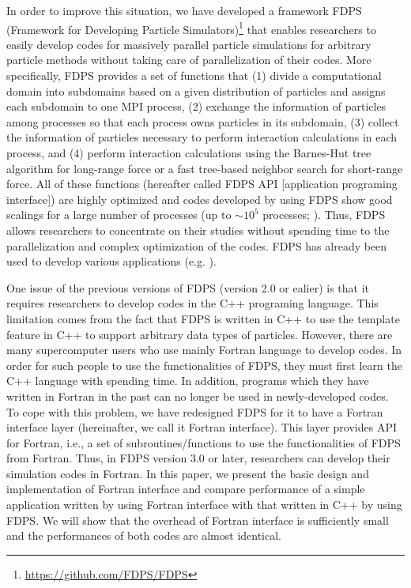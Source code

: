 \documentclass[twocolumn,useamsfonts]{pasj01}
\begin{document}
In order to improve this situation, we have developed a framework FDPS (Framework for Developing Particle Simulators)\footnote{\url{https://github.com/FDPS/FDPS}} \citep{2015FDPS,iwasawa16:_implem_fdps} that enables researchers to easily develop codes for massively parallel particle simulations for arbitrary particle methods without taking care of parallelization of their codes. More specifically, FDPS provides a set of functions that (1) divide a computational domain into subdomains based on a given distribution of particles and assigns each subdomain to one MPI process, (2) exchange the information of particles among processes so that each process owns particles in its subdomain, (3) collect the information of particles necessary to perform interaction calculations in each process, and (4) perform interaction calculations using the Barnes-Hut tree algorithm for long-range force or a fast tree-based neighbor search for short-range force. All of these functions (hereafter called FDPS API [application programing interface]) are highly optimized and codes developed by using FDPS show good scalings for a large number of processes (up to $\sim 10^{5}$ processes; \citet{iwasawa16:_implem_fdps}). Thus, FDPS allows researchers to concentrate on their studies without spending time to the parallelization and complex optimization of the codes. FDPS has already been used to develop various applications (e.g. \cite{hosono16:_a_comparison_of_sph,hosono16:_the_giant_impact,hosono17:_unconv_of_very_large,michikoshi17a:_simulat_smallest,tanikawa17:_does_explo_nucl,iwasawa17:_pentacle_parallelized,tanikawa18:_tidal_double_detona,tanikawa18:_high_resolution_hydro}).

One issue of the previous versions of FDPS (version 2.0 or ealier) is that it requires researchers to develop codes in the C++ programing language. This limitation comes from the fact that FDPS is written in C++ to use the template feature in C++ to support arbitrary data types of particles. However, there are many supercomputer users who use mainly Fortran language to develop codes. In order for such people to use the functionalities of FDPS, they must first learn the C++ language with spending time. In addition, programs which they have written in Fortran in the past can no longer be used in newly-developed codes. To cope with this problem, we have redesigned FDPS for it to have a Fortran interface layer (hereinafter, we call it Fortran interface). This layer provides API for Fortran, i.e., a set of subroutines/functions to use the functionalities of FDPS from Fortran. Thus, in FDPS version 3.0 or later, researchers can develop their simulation codes in Fortran. In this paper, we present the basic design and implementation of Fortran interface and compare performance of a simple application written by using Fortran interface with that written in C++ by using FDPS. We will show that the overhead of Fortran interface is sufficiently small and the performances of both codes are almost identical.
\end{document}
